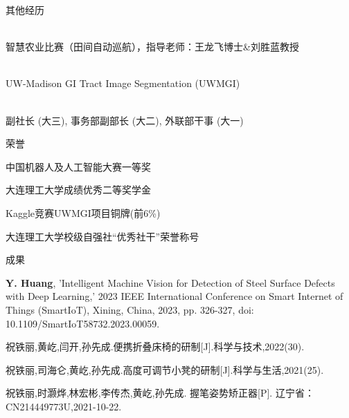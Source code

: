 \documentclass{resume} %
\begin{document}
\begin{rSection}{\fangsong 其他经历}
	
	\begin{rSubsection}{}{}
		{}{}
		\item {\\ 智慧农业比赛（田间自动巡航），指导老师：王龙飞博士\&刘胜蓝教授}\\
		
		\item {\\UW-Madison GI Tract Image Segmentation (UWMGI)}\\
		
		\item {\\副社长 (大三), 事务部副部长 (大二), 外联部干事 (大一)}\\
	\end{rSubsection}
	
\end{rSection}
\newpage
\begin{rSection}{\fangsong 荣誉}

\begin{rSubsection}{}{}
{}{}
  \item {\fangsong 中国机器人及人工智能大赛一等奖}\\
  \item {\fangsong 大连理工大学成绩优秀二等奖学金}\\
  \item {\fangsong Kaggle竞赛UWMGI项目铜牌(前6\%)}\\
  \item {\fangsong 大连理工大学校级自强社“优秀社干”荣誉称号}\\
\end{rSubsection}
\end{rSection}

\begin{rSection}{\fangsong 成果}
\begin{rSubsection}{}{}
{}{}
	\item {{\bf Y. Huang}, 'Intelligent Machine Vision for Detection of Steel Surface Defects with Deep Learning,' 2023 IEEE International Conference on Smart Internet of Things (SmartIoT), Xining, China, 2023, pp. 326-327, doi: 10.1109/SmartIoT58732.2023.00059.}\\
  \item {\fangsong 祝铁丽,黄屹,闫开,孙先成.便携折叠床椅的研制[J].科学与技术,2022(30).}\\
  \item {\fangsong 祝铁丽,司海仑,黄屹,孙先成.高度可调节小凳的研制[J].科学与生活,2021(25).}\\
  \item {\fangsong 祝铁丽,时灏烨,林宏彬,李传杰,黄屹,孙先成. 握笔姿势矫正器[P]. 辽宁省：CN214449773U,2021-10-22.}\\
\end{rSubsection}
\end{rSection}

\end{document}
